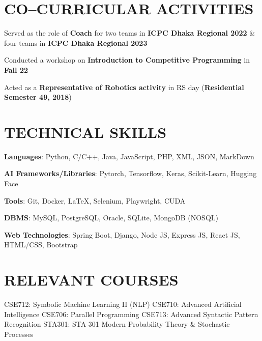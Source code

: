 \documentclass[letterpaper,10.5pt]{article}
\begin{document}
\newpage
\section{CO--CURRICULAR ACTIVITIES}

\begin{itemize}[leftmargin=0.2in, label={}, parsep=-3pt]
  \small{
  \item [\ding{109}]{
        Served as the role of \textbf{Coach} for two teams in \textbf{ICPC Dhaka Regional 2022} \& four teams in \textbf{ICPC Dhaka Regional 2023}} \\
  \item [\ding{109}]{Conducted a workshop on \textbf{Introduction to Competitive Programming} in \textbf{Fall 22}}
  \item [\ding{109}]{Acted as a \textbf{Representative of Robotics activity} in RS day (\textbf{Residential Semester 49, 2018})}
        }
\end{itemize}
\vspace{-16pt}


\section{TECHNICAL SKILLS}
\vspace{-0.5pt}
\begin{itemize}[leftmargin=0in, label={}, parsep=-2pt]
  \small{\item{
                \textbf{Languages}{: Python, C/C++, Java, JavaScript, PHP, XML, JSON, MarkDown}}
    \item{\textbf{AI Frameworks/Libraries}{: Pytorch, Tensorflow, Keras, Scikit-Learn, Hugging Face}}
    \item{\textbf{Tools}{: Git, Docker, \LaTeX, Selenium, Playwright, CUDA}}
    \item{\textbf{DBMS}{: MySQL, PostgreSQL, Oracle, SQLite, MongoDB (NOSQL)}}
    \item{\textbf{Web Technologies}{: Spring Boot, Django, Node JS, Express JS, React JS, HTML/CSS, Bootstrap}}
  }
\end{itemize}
\vspace{-16pt}

\section{RELEVANT COURSES}
CSE712: Symbolic Machine Learning II (NLP)
CSE710: Advanced Artificial Intelligence
CSE706: Parallel Programming
CSE713: Advanced Syntactic Pattern Recognition
STA301: STA 301 Modern Probability Theory \& Stochastic Processes
\end{document}
